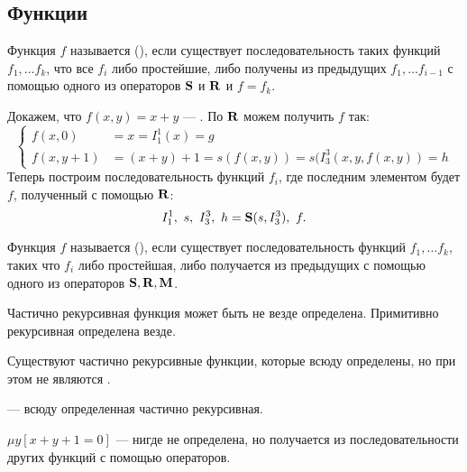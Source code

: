 \subsection{Функции}
\begin{defn}
	Функция $ f$ называется  (\prf),
	если 
	существует последовательность таких функций  $ f_1, \ldots f_k$, что
	все $ f_i$ либо простейшие, либо получены из предыдущих $ f_1, \ldots f_{i-1}$ с помощью одного из операторов $\S$ и $\R$ и $ f = f_k$.
\end{defn}


\begin{ex}\label{ex:1}
	Докажем, что $ f(x, y) = x + y$ --- \prf. По  $ \R$ можем получить $ f$ так:
	\[
	\begin{cases}
		f(x, 0) &= x = I^{1}_{1} (x) =g \\
		f(x, y+1) &= (x + y) + 1 = s(f(x, y)) = s(I^{3}_{3} (x, y, f(x, y)) = h 
	\end{cases}
	\] 
	Теперь построим последовательность функций $ f_i$, где последним элементом будет $ f$, полученный с помощью $ \R$: 
	\[
		I^{1}_{1} , ~s, ~I^{3}_{3} , ~ h = \S(s, I^{3}_{3}) ,~ f
	.\] 
\end{ex}


\begin{defn}
	Функция $ f$ называется  (\crf), если существует последовательность функций $ f_1, \ldots f_k$, таких что $ f_i$ либо простейшая, либо получается из предыдущих с помощью одного из операторов  $ \S, \R, \M$.
\end{defn}

\begin{note}
    Частично рекурсивная функция может быть не везде определена. Примитивно рекурсивная определена везде.
\end{note}
\begin{note}
    Существуют частично рекурсивные функции, которые всюду определены, но при этом не являются \prf.
\end{note}

\begin{defn}
	 --- всюду определенная частично рекурсивная.
\end{defn}


\begin{ex}
	$ \mu y [x + y + 1 = 0]$ --- нигде не определена, но получается из последовательности других функций с помощью операторов.
\end{ex}



